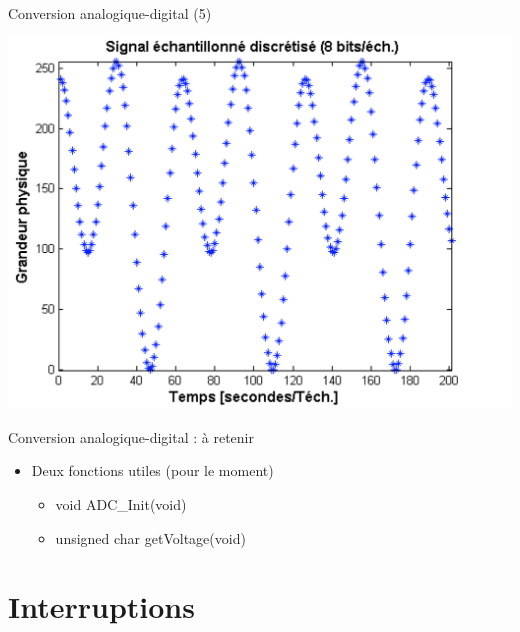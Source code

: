 \begin{frame}{Conversion analogique-digital (5)}

\begin{center}
\includegraphics[width=.8\textwidth]{images/ad_4.png}
\end{center}

\end{frame}

\begin{frame}{Conversion analogique-digital : à retenir}

\begin{itemize}
\itemsep1pt\parskip0pt
\item
  Deux fonctions utiles (pour le moment)

  \begin{itemize}
  \itemsep1pt\parskip0pt
  \item
    void ADC\_Init(void)
  \item
    unsigned char getVoltage(void)
  \end{itemize}
\end{itemize}

\end{frame}

\section{Interruptions}\label{interruptions}

